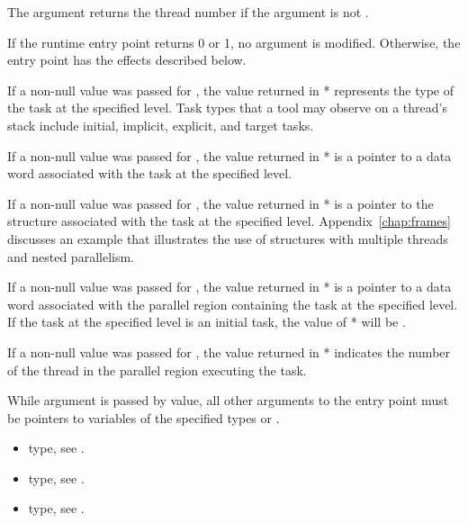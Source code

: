 The argument  returns the thread number
if the argument is not .

\effect


If the runtime entry point returns 0 or 1, no argument is modified.
Otherwise, the entry point has the effects described below.

If a non-null value was passed for ,
the value returned in * represents the type of the task
at the specified level.
Task types that a tool may observe on a thread's stack include
initial, implicit, explicit, and target tasks.

If a non-null value was passed for ,
the value returned in * is a pointer to a data word
associated with the task at the specified level.

If a non-null value was passed for ,
the value returned in * is a pointer to the
 structure associated with the task at the specified level.
Appendix~\ref{chap:frames} discusses an example that
illustrates the use of  structures with multiple
threads and nested parallelism.

If a non-null value was passed for ,
the value returned in * is a pointer to a data word
associated with the parallel region containing the task at the specified level.
If the task at the specified level is an initial task,
the value of * will be .

If a non-null value was passed for ,
the value returned in *
indicates the number of the thread in the parallel region executing the task.

\constraints
While argument  is passed by
value, all other arguments to the entry point must be pointers
to variables of the specified types or .

\crossreferences
\begin{itemize}
\item {} type, see .
\item {} type, see
  .
\item {} type, see .
\end{itemize}

\label{sec:ompt_get_task_memory_t}
\label{sec:ompt_get_task_memory}

